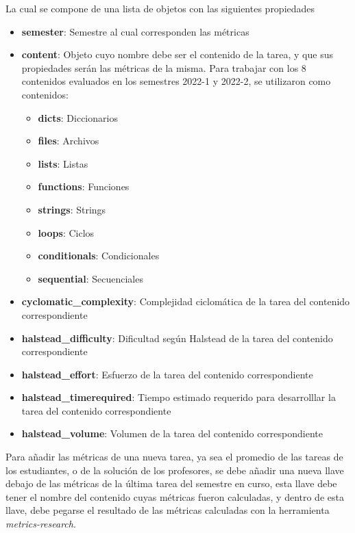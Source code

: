 \documentclass[letterpaper,12pt]{article}
\begin{document}
La cual se compone de una lista de objetos con las siguientes propiedades
\begin{itemize}
  \item \textbf{semester}: Semestre al cual corresponden las métricas
  \item \textbf{content}: Objeto cuyo nombre debe ser el contenido de la tarea, y que sus propiedades serán las métricas de la misma. Para trabajar con los 8 contenidos evaluados en los semestres 2022-1 y 2022-2, se utilizaron como contenidos:
        \begin{itemize}
          \item \textbf{dicts}: Diccionarios
          \item \textbf{files}: Archivos
          \item \textbf{lists}: Listas
          \item \textbf{functions}: Funciones
          \item \textbf{strings}: Strings
          \item \textbf{loops}: Ciclos
          \item \textbf{conditionals}: Condicionales
          \item \textbf{sequential}: Secuenciales
        \end{itemize}
  \item \textbf{cyclomatic\_complexity}: Complejidad ciclomática de la tarea del contenido correspondiente
  \item \textbf{halstead\_difficulty}: Dificultad según Halstead de la tarea del contenido correspondiente
  \item \textbf{halstead\_effort}: Esfuerzo de la tarea del contenido correspondiente
  \item \textbf{halstead\_timerequired}: Tiempo estimado requerido para desarrolllar la tarea del contenido correspondiente
  \item \textbf{halstead\_volume}: Volumen de la tarea del contenido correspondiente
\end{itemize}
Para añadir las métricas de una nueva tarea, ya sea el promedio de las tareas de los estudiantes, o de la solución de los profesores, se debe añadir una nueva llave debajo de las métricas de la última tarea del semestre en curso, esta llave debe tener el nombre del contenido cuyas métricas fueron calculadas, y dentro de esta llave, debe pegarse el resultado de las métricas calculadas con la herramienta \textit{metrics-research}.
\end{document}
